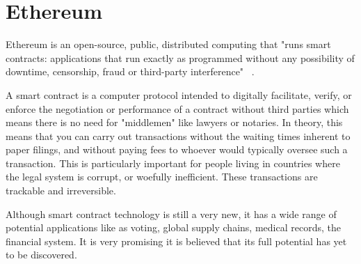 \section{Ethereum}

Ethereum  is an open-source, public,  distributed computing that "runs smart contracts: applications that run exactly as programmed without any possibility of downtime, censorship, fraud or third-party interference" ~\cite{hid-sp18-506-EthereumOrg}.

A smart contract is a computer protocol intended to digitally facilitate, verify, or enforce the negotiation or performance of a contract without third parties which means there is no need for "middlemen" like lawyers or notaries. In theory, this means that you can carry out transactions without the waiting times inherent to paper filings, and without paying fees to whoever would typically oversee such a transaction. This is particularly important for people living in countries where the legal system is corrupt, or woefully inefficient. These transactions are trackable and irreversible.

Although smart contract technology is still a very new, it has a wide range of potential applications like as voting, global supply chains, medical records, the financial system. It is very promising it is believed that its full potential has yet to be discovered.
